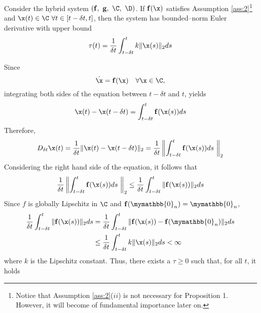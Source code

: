 \begin{prop}\label{prop:criteria}
   	Consider the hybrid system
   	$(\mathbf{\mathbf{f}},~\mathbf{g},~\C,~\D)$. If $\mathbf{\mathbf{f}}(\x)$ satisfies
   	Assumption \ref{ass:2}\footnote{Notice that Assumption \ref{ass:2}($ii$) is
   	not necessary for Proposition 1. However, it will become of fundamental
   	importance later on.} and $\x(t)\in \C ~\forall t \in [t-\delta t,t]$,
   	then the system has bounded--norm Euler derivative with upper bound
	\begin{equation}\label{eq:bound}
		\tau(t)=\frac{1}{\delta t}\int_{t-\delta t}^{t}k\|\x(s)\|_2ds
	\end{equation}
\end{prop}
%
\proof\noindent
    Since
    \begin{equation}
        \dot{\x} = \mathbf{\mathbf{f}}(\x)\quad\forall\x\in\C, 
    \end{equation}
    integrating both sides of the equation between $t-\delta t$ and $t$, yields
    \begin{equation}
        \x(t)-\x(t-\delta t) = \int_{t-\delta t}^{t}\mathbf{\mathbf{f}}(\x(s))ds
    \end{equation}
    Therefore,
    \begin{equation}%
	    D_{\delta t}\x(t)=\frac{1}{\delta t}\|\x(t)-\x(t-\delta t)\|_2 = \frac{1}{\delta t}\left\lVert\int_{t-\delta t}^{t}\mathbf{\mathbf{f}}(\x(s))ds~\right\rVert_2
    \end{equation}
    Considering the right hand side of the equation, it follows that
    \begin{equation}
        \frac{1}{\delta t}\left\lVert\int_{t-\delta t}^{t}\mathbf{\mathbf{f}}(\x(s))ds~\right\rVert_2\leq\frac{1}{\delta t}\int_{t-\delta t}^{t}\|\mathbf{\mathbf{f}}(\x(s))\|_2ds
    \end{equation}
    Since $f$ is globally Lipschitz in $\C$ and $\mathbf{\mathbf{f}}(\mymathbb{0}_n) = \mymathbb{0}_n$,
    \begin{align}
	    \frac{1}{\delta t}\int_{t-\delta t}^{t}\|\mathbf{\mathbf{f}}(\x(s))\|_2ds &= \frac{1}{\delta t}\int_{t-\delta t}^{t}\|\mathbf{\mathbf{f}}(\x(s))-\mathbf{\mathbf{f}}(\mymathbb{0}_n)\|_2ds\\
	    &\leq\frac{1}{\delta t}\int_{t-\delta t}^{t}k\|\x(s)\|_2ds<\infty
    \end{align}
    where $k$ is the Lipschitz constant. Thus, there exists a $\tau\geq 0$ such that, for all $t$, it holds
